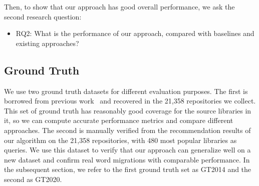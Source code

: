\documentclass[conference, 10pt]{IEEEtran}
\begin{document}
Then, to show that our approach has good overall performance, %
we 
ask the second research question:
\begin{itemize}
    \item RQ2: What is the performance of our approach, %
    compared with baselines and existing approaches?
\end{itemize}


\subsection{Ground Truth}
\label{subsec:ground-truth}

We use two ground truth datasets for different evaluation purposes. 
The first is borrowed from previous work~\cite{2014JournalOfSysAndSoft-Teyton-Study} and recovered in the 21,358 repositories we collect.
This set of ground truth has reasonably good coverage for the source libraries in it, so we can compute accurate performance metrics and compare different approaches.
The second is manually verified from the recommendation results of our algorithm on the 21,358 repositories, with 480 most popular libraries as queries. 
We use this dataset to verify that our approach can generalize well on a new dataset and confirm real word migrations with comparable performance.
In the subsequent section, we refer to the first ground truth set as GT2014 and the second as GT2020.
\end{document}
